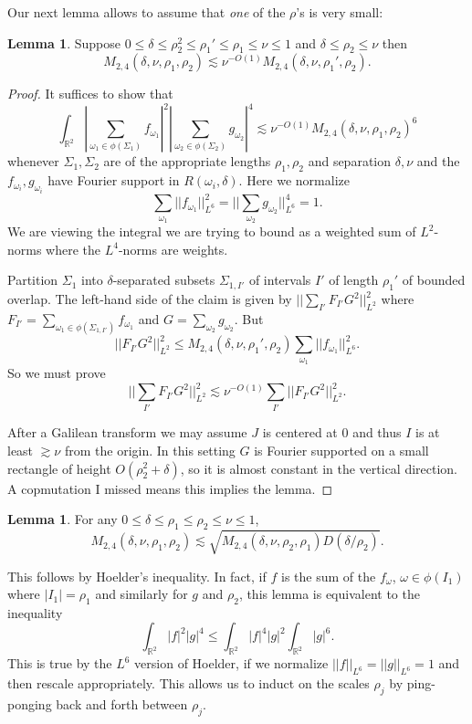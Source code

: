 \documentclass[12pt]{report}
\newcommand{\RR}{\mathbb{R}}
\theoremstyle{definition}
\newtheorem{lemma}[theorem]{Lemma}
\begin{document}
Our next lemma allows to assume that \emph{one} of the $\rho$'s is very small:
\begin{lemma}
Suppose $0 \leq \delta \leq \rho_2^2 \leq \rho_1' \leq \rho_1 \leq \nu \leq 1$ and $\delta \leq \rho_2 \leq \nu$ then
$$M_{2,4}(\delta, \nu, \rho_1, \rho_2) \lesssim \nu^{-O(1)}M_{2,4}(\delta, \nu, \rho_1', \rho_2).$$
\end{lemma}
\begin{proof}
It suffices to show that
$$\int_{\RR^2} |\sum_{\omega_1 \in \phi(\Sigma_1)} f_{\omega_1}|^2 |\sum_{\omega_2 \in \phi(\Sigma_2)} g_{\omega_2}|^4 \lesssim \nu^{-O(1)} M_{2,4}(\delta, \nu, \rho_1, \rho_2)^6$$
whenever $\Sigma_1,\Sigma_2$ are of the appropriate lengths $\rho_1,\rho_2$ and separation $\delta,\nu$ and the $f_{\omega_i},g_{\omega_i}$ have Fourier support in $R(\omega_i,\delta)$. Here we normalize
$$\sum_{\omega_1} ||f_{\omega_1}||_{L^6}^2 = ||\sum_{\omega_2} g_{\omega_2}||_{L^6}^4 = 1.$$
We are viewing the integral we are trying to bound as a weighted sum of $L^2$-norms where the $L^4$-norms are weights.

Partition $\Sigma_1$ into $\delta$-separated subsets $\Sigma_{1,I'}$ of intervals $I'$ of length $\rho_1'$ of bounded overlap.
The left-hand side of the claim is given by $||\sum_{I'} F_{I'}G^2||^2_{L^2}$ where $F_{I'} = \sum_{\omega_1 \in \phi(\Sigma_{1,I'})} f_{\omega_1}$ and $G = \sum_{\omega_2}g_{\omega_2}$.
But
$$||F_{I'}G^2||_{L^2}^2 \leq M_{2,4}(\delta, \nu, \rho_1', \rho_2) \sum_{\omega_1} ||f_{\omega_1}||_{L^6}^2.$$
So we must prove
$$||\sum_{I'} F_{I'}G^2||_{L^2}^2 \lesssim \nu^{-O(1)} \sum_{I'} ||F_{I'}G^2||_{L^2}^2.$$

After a Galilean transform we may assume $J$ is centered at $0$ and thus $I$ is at least $\gtrsim \nu$ from the origin.
In this setting $G$ is Fourier supported on a small rectangle of height $O(\rho_2^2 + \delta)$, so it is almost constant in the vertical direction.
A copmutation I missed means this implies the lemma.
\end{proof}

\begin{lemma}
For any $0 \leq \delta \leq \rho_1 \leq \rho_2 \leq \nu \leq 1$,
$$M_{2,4}(\delta, \nu, \rho_1, \rho_2) \lesssim \sqrt{M_{2,4}(\delta, \nu, \rho_2, \rho_1) D(\delta/\rho_2)}.$$
\end{lemma}
This follows by Hoelder's inequality. In fact, if $f$ is the sum of the $f_\omega$, $\omega \in \phi(I_1)$ where $|I_1| = \rho_1$ and similarly for $g$ and $\rho_2$,
this lemma is equivalent to the inequality
$$\int_{\RR^2} |f|^2|g|^4 \leq \int_{\RR^2} |f|^4|g|^2 \int_{\RR^2} |g|^6.$$
This is true by the $L^6$ version of Hoelder, if we normalize $||f||_{L^6} = ||g||_{L^6} = 1$ and then rescale appropriately.
This allows us to induct on the scales $\rho_j$ by ping-ponging back and forth between $\rho_j$.
\end{document}
